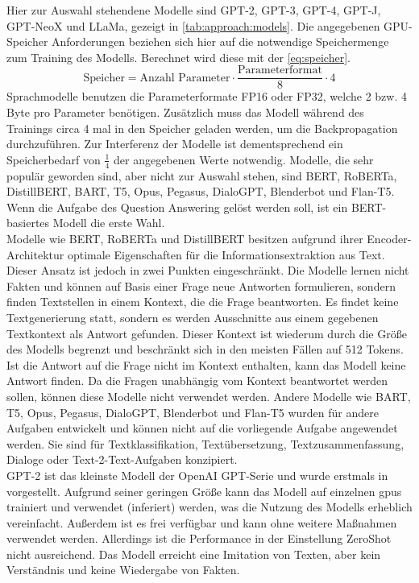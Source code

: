 Hier zur Auswahl stehendene Modelle sind GPT-2, GPT-3, GPT-4, GPT-J, GPT-NeoX und LLaMa, gezeigt in \cref{tab:approach:models}.
Die angegebenen GPU-Speicher Anforderungen beziehen sich hier auf die notwendige Speichermenge zum Training des Modells.
Berechnet wird diese mit der \cref{eq:speicher}.
\begin{equation}\label{eq:speicher}
    \text{Speicher}=\text{Anzahl Parameter} \cdot \frac{\text{Parameterformat}}{8} \cdot 4
\end{equation}
Sprachmodelle benutzen die Parameterformate FP16 oder FP32, welche 2 bzw. 4 Byte pro Parameter benötigen. Zusätzlich muss das Modell während des Trainings circa 4 mal in den Speicher geladen werden, um die Backpropagation durchzuführen. Zur Interferenz der Modelle ist dementsprechend ein Speicherbedarf von $\frac{1}{4}$ der angegebenen Werte notwendig.
Modelle, die sehr populär geworden sind, aber nicht zur Auswahl stehen, sind BERT, RoBERTa, DistillBERT, BART, T5, Opus, Pegasus, DialoGPT, Blenderbot und Flan-T5.
Wenn die Aufgabe des Question Answering gelöst werden soll, ist ein BERT-basiertes Modell die erste Wahl.\\

Modelle wie BERT, RoBERTa und DistillBERT besitzen aufgrund ihrer Encoder-Architektur optimale Eigenschaften für die Informationsextraktion aus Text.
Dieser Ansatz ist jedoch in zwei Punkten eingeschränkt.
Die Modelle lernen nicht Fakten und können auf Basis einer Frage neue Antworten formulieren, sondern finden Textstellen in einem Kontext, die die Frage beantworten.
Es findet keine Textgenerierung statt, sondern es werden Ausschnitte aus einem gegebenen Textkontext als Antwort gefunden.
Dieser Kontext ist wiederum durch die Größe des Modells begrenzt und beschränkt sich in den meisten Fällen auf 512 Tokens.
Ist die Antwort auf die Frage nicht im Kontext enthalten, kann das Modell keine Antwort finden.
Da die Fragen unabhängig vom Kontext beantwortet werden sollen, können diese Modelle nicht verwendet werden.
Andere Modelle wie BART, T5, Opus, Pegasus, DialoGPT, Blenderbot und Flan-T5 wurden für andere Aufgaben entwickelt und können nicht auf die vorliegende Aufgabe angewendet werden.
Sie sind für Textklassifikation, Textübersetzung, Textzusammenfassung, Dialoge oder Text-2-Text-Aufgaben konzipiert.\\

GPT-2 ist das kleinste Modell der OpenAI GPT-Serie und wurde erstmals in \citet{gpt2} vorgestellt.
Aufgrund seiner geringen Größe kann das Modell auf einzelnen \ac{gpu}s trainiert und verwendet (inferiert) werden, was die Nutzung des Modells erheblich vereinfacht.
Außerdem ist es frei verfügbar und kann ohne weitere Maßnahmen verwendet werden.
Allerdings ist die Performance in der Einstellung ZeroShot nicht ausreichend.
Das Modell erreicht eine Imitation von Texten, aber kein Verständnis und keine Wiedergabe von Fakten.\\

